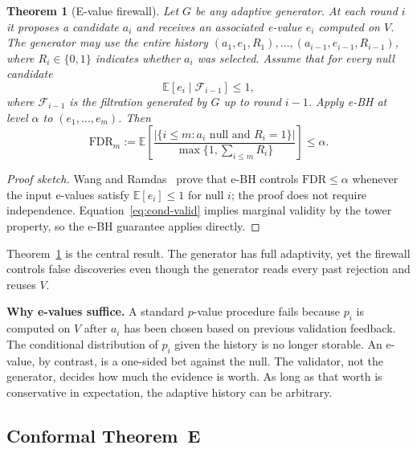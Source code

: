 \documentclass[sigconf]{acmart}
\theoremstyle{plain}
\newtheorem{theorem}{Theorem}[section]
\begin{document}
\begin{theorem}[E-value firewall]\label{thm:e}
Let $G$ be any adaptive generator. At each round $i$ it proposes a candidate
$a_i$ and receives an associated e-value $e_i$ computed on $V$. The generator
may use the entire history $(a_1,e_1,R_1),\dots,(a_{i-1},e_{i-1},R_{i-1})$,
where $R_i\in\{0,1\}$ indicates whether $a_i$ was selected. Assume that for
every null candidate
\begin{equation}\label{eq:cond-valid}
\mathbb{E}\left[ e_i \mid \mathcal{F}_{i-1} \right] \le 1,
\end{equation}
where $\mathcal{F}_{i-1}$ is the filtration generated by $G$ up to round $i-1$.
Apply e-BH at level $\alpha$ to $(e_1,\dots,e_m)$. Then
\begin{equation}
\mathrm{FDR}_m
:= \mathbb{E}\!\left[ \frac{|\{i\le m : a_i\text{ null and }R_i=1\}|}
                       {\max\{1,\sum_{i\le m} R_i\}} \right]
\le \alpha.
\end{equation}
\end{theorem}

\begin{proof}[Proof sketch]
Wang and Ramdas~\cite{wang2022} prove that e-BH controls
$\mathrm{FDR}\le\alpha$ whenever the input e-values satisfy
$\mathbb{E}[e_i]\le 1$ for null $i$; the proof does not require independence.
Equation~\eqref{eq:cond-valid} implies marginal validity by the tower property,
so the e-BH guarantee applies directly.
\end{proof}

Theorem~\ref{thm:e} is the central result. The generator has full adaptivity,
yet the firewall controls false discoveries even though the generator reads
every past rejection and reuses $V$.

\textbf{Why e-values suffice.} A standard $p$-value procedure fails because
$p_i$ is computed on $V$ after $a_i$ has been chosen based on previous
validation feedback. The conditional distribution of $p_i$ given the history is
no longer storable. An e-value, by contrast, is a one-sided bet against the
null. The validator, not the generator, decides how much the evidence is worth.
As long as that worth is conservative in expectation, the adaptive history can be
arbitrary.

\subsection{Conformal Theorem~E}\label{sec:conformal-e}
\end{document}
